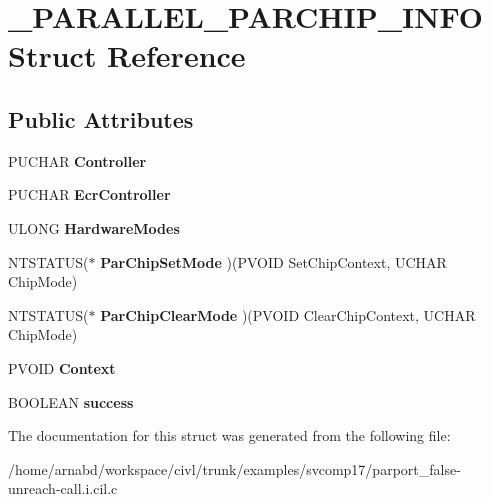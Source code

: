 \hypertarget{struct__PARALLEL__PARCHIP__INFO}{}\section{\+\_\+\+P\+A\+R\+A\+L\+L\+E\+L\+\_\+\+P\+A\+R\+C\+H\+I\+P\+\_\+\+I\+N\+F\+O Struct Reference}
\label{struct__PARALLEL__PARCHIP__INFO}
\subsection*{Public Attributes}
\begin{DoxyCompactItemize}
\item 
\hypertarget{struct__PARALLEL__PARCHIP__INFO_a9d2d0db27d8bf4d007b6fbe8e9ac55cd}{}P\+U\+C\+H\+A\+R {\bfseries Controller}\label{struct__PARALLEL__PARCHIP__INFO_a9d2d0db27d8bf4d007b6fbe8e9ac55cd}

\item 
\hypertarget{struct__PARALLEL__PARCHIP__INFO_a9efa8f359236ae2127c83633c5fa23e5}{}P\+U\+C\+H\+A\+R {\bfseries Ecr\+Controller}\label{struct__PARALLEL__PARCHIP__INFO_a9efa8f359236ae2127c83633c5fa23e5}

\item 
\hypertarget{struct__PARALLEL__PARCHIP__INFO_a70774dfae186444819ccee27f1193ee9}{}U\+L\+O\+N\+G {\bfseries Hardware\+Modes}\label{struct__PARALLEL__PARCHIP__INFO_a70774dfae186444819ccee27f1193ee9}

\item 
\hypertarget{struct__PARALLEL__PARCHIP__INFO_a0c6f7f6a92538d94cd69e0755f62cb15}{}N\+T\+S\+T\+A\+T\+U\+S($\ast$ {\bfseries Par\+Chip\+Set\+Mode} )(P\+V\+O\+I\+D Set\+Chip\+Context, U\+C\+H\+A\+R Chip\+Mode)\label{struct__PARALLEL__PARCHIP__INFO_a0c6f7f6a92538d94cd69e0755f62cb15}

\item 
\hypertarget{struct__PARALLEL__PARCHIP__INFO_acb15fbeeead49df2b7ad71b6d8f157e9}{}N\+T\+S\+T\+A\+T\+U\+S($\ast$ {\bfseries Par\+Chip\+Clear\+Mode} )(P\+V\+O\+I\+D Clear\+Chip\+Context, U\+C\+H\+A\+R Chip\+Mode)\label{struct__PARALLEL__PARCHIP__INFO_acb15fbeeead49df2b7ad71b6d8f157e9}

\item 
\hypertarget{struct__PARALLEL__PARCHIP__INFO_ad9f3703439804b41032948b80f341809}{}P\+V\+O\+I\+D {\bfseries Context}\label{struct__PARALLEL__PARCHIP__INFO_ad9f3703439804b41032948b80f341809}

\item 
\hypertarget{struct__PARALLEL__PARCHIP__INFO_a5fe70069e828e9baddd73893767c491e}{}B\+O\+O\+L\+E\+A\+N {\bfseries success}\label{struct__PARALLEL__PARCHIP__INFO_a5fe70069e828e9baddd73893767c491e}

\end{DoxyCompactItemize}


The documentation for this struct was generated from the following file\+:\begin{DoxyCompactItemize}
\item 
/home/arnabd/workspace/civl/trunk/examples/svcomp17/parport\+\_\+false-\/unreach-\/call.\+i.\+cil.\+c\end{DoxyCompactItemize}
